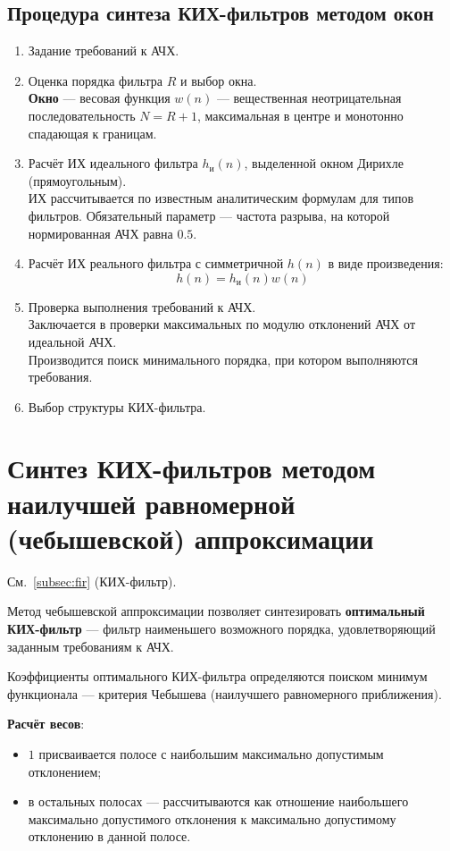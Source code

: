 \documentclass[a4paper, 14pt]{extarticle}
\begin{document}
\subsection{Процедура синтеза КИХ-фильтров методом окон}
\begin{enumerate}
    \item Задание требований к АЧХ.
    \item Оценка порядка фильтра $R$ и выбор окна.\\
        \textbf{Окно} --- весовая функция $w(n)$ --- вещественная неотрицательная последовательность $N=R+1$, максимальная в центре и монотонно спадающая к границам.
    \item Расчёт ИХ идеального фильтра $h_\text{и}(n)$, выделенной окном Дирихле (прямоугольным).\\
        ИХ рассчитывается по известным аналитическим формулам для типов фильтров. Обязательный параметр --- частота разрыва, на которой нормированная АЧХ равна $0.5$.
    \item Расчёт ИХ реального фильтра с симметричной $h(n)$ в виде произведения:
        \begin{equation}
            h(n) = h_\text{и}(n)w(n)
        \end{equation}
    \item Проверка выполнения требований к АЧХ.\\
        Заключается в проверки максимальных по модулю отклонений АЧХ от идеальной АЧХ.\\
        Производится поиск минимального порядка, при котором выполняются требования.
    \item Выбор структуры КИХ-фильтра.
\end{enumerate}

\section{Синтез КИХ-фильтров методом наилучшей равномерной (чебышевской) аппроксимации}
См.~\ref{subsec:fir} (КИХ-фильтр).

Метод чебышевской аппроксимации позволяет синтезировать \textbf{оптимальный КИХ-фильтр} --- фильтр наименьшего возможного порядка, удовлетворяющий заданным требованиям к АЧХ.

Коэффициенты оптимального КИХ-фильтра определяются поиском минимум функционала --- критерия Чебышева (наилучшего равномерного приближения).

\textbf{Расчёт весов}:
\begin{itemize}
    \item $1$ присваивается полосе с наибольшим максимально допустимым отклонением;
    \item в остальных полосах --- рассчитываются как отношение наибольшего максимально допустимого отклонения к максимально допустимому отклонению в данной полосе.
\end{itemize}
\end{document}
